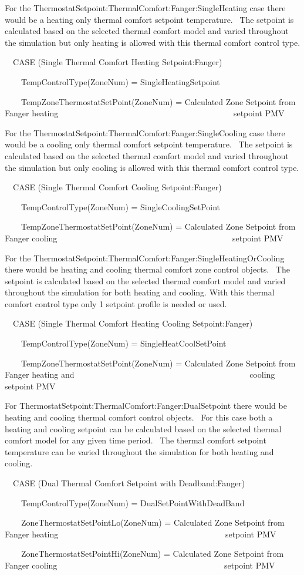 For the ThermostatSetpoint:ThermalComfort:Fanger:SingleHeating case there would be a heating only thermal comfort setpoint temperature.~ The setpoint is calculated based on the selected thermal comfort model and varied throughout the simulation but only heating is allowed with this thermal comfort control type.

~~CASE (Single Thermal Comfort Heating Setpoint:Fanger)

~~~~TempControlType(ZoneNum) = SingleHeatingSetpoint

~~~~TempZoneThermostatSetPoint(ZoneNum) = Calculated Zone Setpoint from Fanger heating
~~~~~~~~~~~~~~~~~~~~~~~~~~~~~~~~~~~~~~~~~~setpoint PMV

For the ThermostatSetpoint:ThermalComfort:Fanger:SingleCooling case there would be a cooling only thermal comfort setpoint temperature.~ The setpoint is calculated based on the selected thermal comfort model and varied throughout the simulation but only cooling is allowed with this thermal comfort control type.

~~CASE (Single Thermal Comfort Cooling Setpoint:Fanger)

~~~~TempControlType(ZoneNum) = SingleCoolingSetPoint

~~~~TempZoneThermostatSetPoint(ZoneNum) = Calculated Zone Setpoint from Fanger cooling
~~~~~~~~~~~~~~~~~~~~~~~~~~~~~~~~~~~~~~~~~~setpoint PMV

For the ThermostatSetpoint:ThermalComfort:Fanger:SingleHeatingOrCooling there would be heating and cooling thermal comfort zone control objects.~ The setpoint is calculated based on the selected thermal comfort model and varied throughout the simulation for both heating and cooling. With this thermal comfort control type only 1 setpoint profile is needed or used.

~~CASE (Single Thermal Comfort Heating Cooling Setpoint:Fanger)

~~~~TempControlType(ZoneNum) = SingleHeatCoolSetPoint

~~~~TempZoneThermostatSetPoint(ZoneNum) = Calculated Zone Setpoint from Fanger heating and
~~~~~~~~~~~~~~~~~~~~~~~~~~~~~~~~~~~~~~~~~~cooling setpoint PMV

For ThermostatSetpoint:ThermalComfort:Fanger:DualSetpoint there would be heating and cooling thermal comfort control objects.~ For this case both a heating and cooling setpoint can be calculated based on the selected thermal comfort model for any given time period.~ The thermal comfort setpoint temperature can be varied throughout the simulation for both heating and cooling.

~~CASE (Dual Thermal Comfort Setpoint with Deadband:Fanger)

~~~~TempControlType(ZoneNum) = DualSetPointWithDeadBand

~~~~ZoneThermostatSetPointLo(ZoneNum) = Calculated Zone Setpoint from Fanger heating
~~~~~~~~~~~~~~~~~~~~~~~~~~~~~~~~~~~~~~~~setpoint PMV

~~~~ZoneThermostatSetPointHi(ZoneNum) = Calculated Zone Setpoint from Fanger cooling
~~~~~~~~~~~~~~~~~~~~~~~~~~~~~~~~~~~~~~~~setpoint PMV
